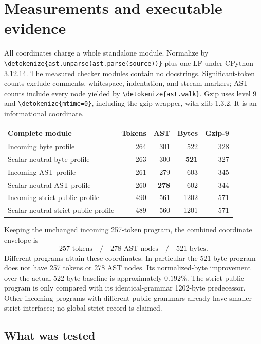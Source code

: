\documentclass[11pt,letterpaper]{article}
\theoremstyle{definition}
\theoremstyle{remark}
\newcommand{\file}[1]{\expandafter\nolinkurl\expandafter{\detokenize{#1}}}
\begin{document}
\section{Measurements and executable evidence}
\label{sec:measurements}

All coordinates charge a whole standalone module. Normalize by
\file{ast.unparse(ast.parse(source))} plus one LF under CPython 3.12.14.
The measured checker modules contain no docstrings. Significant-token
counts exclude comments, whitespace, indentation, and stream markers;
AST counts include every node yielded by \file{ast.walk}. Gzip uses
level 9 and \file{mtime=0}, including the gzip wrapper, with zlib 1.3.2.
It is an informational coordinate.

\begin{center}\small
\begin{tabular}{lrrrr}
\toprule
Complete module & Tokens & AST & Bytes & Gzip-9\\
\midrule
Incoming byte profile & 264 & 301 & 522 & 328\\
Scalar-neutral byte profile & 263 & 300 & \textbf{521} & 327\\
Incoming AST profile & 261 & 279 & 603 & 345\\
Scalar-neutral AST profile & 260 & \textbf{278} & 602 & 344\\
Incoming strict public profile & 490 & 561 & 1202 & 571\\
Scalar-neutral strict public profile & 489 & 560 & 1201 & 571\\
\bottomrule
\end{tabular}
\end{center}

Keeping the unchanged incoming 257-token program, the combined coordinate
envelope is
\[
 \boxed{257\text{ tokens}\quad/\quad278\text{ AST nodes}\quad/\quad521\text{ bytes}.}
\]
Different programs attain these coordinates. In particular the 521-byte
program does not have 257 tokens or 278 AST nodes. Its normalized-byte
improvement over the actual 522-byte baseline is approximately $0.192\%$.
The strict public program is only compared with its identical-grammar
1202-byte predecessor. Other incoming programs with different public
grammars already have smaller strict interfaces; no global strict record
is claimed.

\subsection{What was tested}
\end{document}
